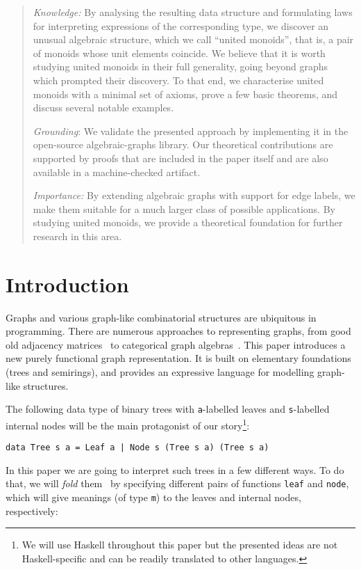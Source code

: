 \documentclass[english,submission]{programming}
\newcommand{\hcode}[1]{{\color{darkblue} \lstinline[keywordstyle={}]|#1|}} %
\begin{document}
\begin{abstract}
\emph{Knowledge:} By analysing the resulting data structure and formulating laws
for interpreting expressions of the corresponding type, we discover an unusual
algebraic structure, which we call ``united monoids'', that is, a pair of
monoids whose unit elements coincide. We believe that it is worth studying
united monoids in their full generality, going beyond graphs which prompted
their discovery. To that end, we characterise united monoids with a minimal set
of axioms, prove a few basic theorems, and discuss several notable examples.

\emph{Grounding}: We validate the presented approach by implementing it in the
open-source \textsf{algebraic-graphs} library. Our theoretical contributions
are supported by proofs that are included in the paper itself and are also
available in a machine-checked artifact.

\emph{Importance:} By extending algebraic graphs with support for edge labels,
we make them suitable for a much larger class of possible applications. By
studying united monoids, we provide a theoretical foundation for further
research in this area.
\end{abstract}

\section{Introduction}
\vspace{-1mm}

Graphs and various graph-like combinatorial structures are ubiquitous in
programming. There are numerous approaches to representing graphs, from good old
adjacency matrices~\cite{cormen2009introduction} to categorical graph
algebras~\cite{2010_selinger_survey}. This paper introduces a new purely
functional graph representation. It is built on elementary foundations
(trees and semirings), and provides an expressive language for modelling
graph-like structures.

The following data type of binary trees with \hcode{a}-labelled leaves and
\hcode{s}-labelled internal nodes will be the main protagonist of our
story\footnote{
    We will use Haskell throughout this paper but the presented ideas
    are not Haskell-specific and can be readily translated to other languages.
}:

\begin{lstlisting}
data Tree s a = Leaf a | Node s (Tree s a) (Tree s a)
\end{lstlisting}

\noindent
In this paper we are going to interpret such trees in a few different ways. To
do that, we will \emph{fold} them~\cite{gibbons_folds} by specifying different
pairs of functions \hcode{leaf} and \hcode{node}, which will give meanings (of
type \hcode{m}) to the leaves and internal nodes, respectively:
\end{document}
